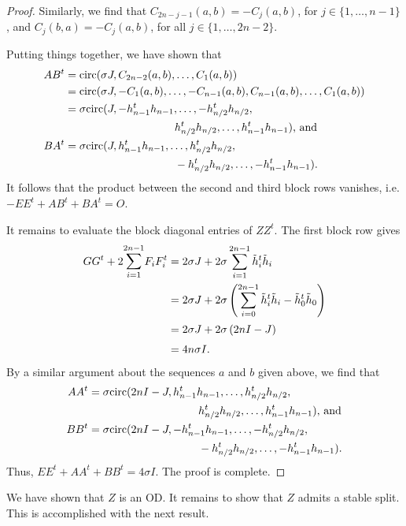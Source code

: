 \documentclass[../../../main]{subfiles}
\begin{document}
\begin{proof}
  Similarly, we find that $C_{2n-j-1}(a,b)=-C_j(a,b)$, for $j \in \{1, \dots, n-1\}$, and $C_j(b,a)=-C_j(a,b)$, for all $j \in \{1, \dots, 2n-2\}$.
  
  Putting things together, we have shown that
  \begin{align*}
   AB^t &= \text{circ}(\sigma J,C_{2n-2}(a,b),\dots,C_1(a,b)) \\
   &= \text{circ}(\sigma J,-C_1(a,b),\dots,-C_{n-1}(a,b),C_{n-1}(a,b),\dots,C_1(a,b)) \\
   &= \sigma\text{circ}(J,-h_{n-1}^th_{n-1}, \dots, -h_{n/2}^th_{n/2},\\ 
   &\qquad\qquad\qquad\qquad\qquad h_{n/2}^th_{n/2},\dots,h_{n-1}^th_{n-1}) \text{, and} \\
   BA^t &= \sigma\text{circ}(J,h_{n-1}^th_{n-1}, \dots, h_{n/2}^th_{n/2},\\ 
   &\qquad\qquad\qquad\qquad\qquad -h_{n/2}^th_{n/2},\dots,-h_{n-1}^th_{n-1}).
  \end{align*}
  It follows that the product between the second and third block rows vanishes, i.e. $-EE^t + AB^t + BA^t = O$.
  
  It remains to evaluate the block diagonal entries of $ZZ^t$. The first block row gives
  \begin{align*}
  GG^t + 2\ssum_{i=1}^{2n-1}F_iF_i^t &= 2\sigma J + 2\sigma\sum_{i=1}^{2n-1}\tilde h_i^t \tilde h_i \\
  &= 2\sigma J + 2\sigma\left(\sum_{i=0}^{2n-1}\tilde h_i^t \tilde h_i - \tilde h_0^t \tilde h_0\right) \\
  &= 2\sigma J + 2\sigma\left( 2nI - J \right) \\
  &= 4n\sigma I.
  \end{align*}
  By a similar argument about the sequences $a$ and $b$ given above, we find that
  \begin{align*}
   AA^t &= \sigma\text{circ}(2nI-J,h_{n-1}^th_{n-1}, \dots, h_{n/2}^th_{n/2},\\ 
   &\qquad\qquad\qquad\qquad\qquad h_{n/2}^th_{n/2},\dots,h_{n-1}^th_{n-1}) \text{, and} \\
   BB^t &= \sigma\text{circ}(2nI-J,-h_{n-1}^th_{n-1}, \dots, -h_{n/2}^th_{n/2},\\ 
   &\qquad\qquad\qquad\qquad\qquad -h_{n/2}^th_{n/2},\dots,-h_{n-1}^th_{n-1}). 
  \end{align*}
  Thus, $EE^t + AA^t + BB^t = 4\sigma I$. The proof is complete.
 \end{proof}
 
 We have shown that $Z$ is an OD. It remains to show that $Z$ admits a stable
 split. This is accomplished with the next result. 
 
\end{document}
